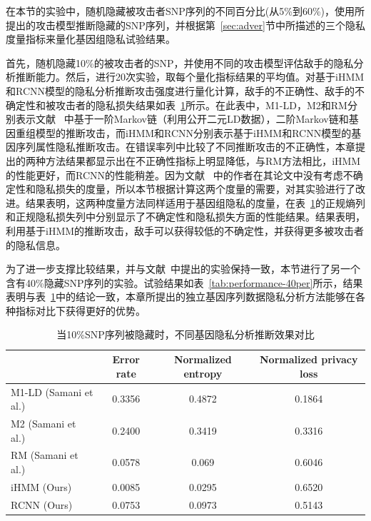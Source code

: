 在本节的实验中，随机隐藏被攻击者SNP序列的不同百分比(从5\%到60\%)，使用所提出的攻击模型推断隐藏的SNP序列，并根据第~\ref{sec:adver}节中所描述的三个隐私度量指标来量化基因组隐私试验结果。

首先，随机隐藏10\%的被攻击者的SNP，并使用不同的攻击模型评估敌手的隐私分析推断能力。然后，进行20次实验，取每个量化指标结果的平均值。对基于iHMM和RCNN模型的隐私分析推断攻击强度进行量化计算，敌手的不正确性、敌手的不确定性和被攻击者的隐私损失结果如表~\ref{tab:performance-10per}所示。在此表中，M1-LD，M2和RM分别表示文献~\cite{samani2015quantifying} 中基于一阶Markov链（利用公开二元LD数据），二阶Markov链和基因重组模型的推断攻击，而iHMM和RCNN分别表示基于iHMM和RCNN模型的基因序列属性隐私推断攻击。在错误率列中比较了不同推断攻击的不正确性，本章提出的两种方法结果都显示出在不正确性指标上明显降低，与RM方法相比，iHMM的性能更好，而RCNN的性能稍差。因为文献~\cite{samani2015quantifying} 中的作者在其论文中没有考虑不确定性和隐私损失的度量，所以本节根据计算这两个度量的需要，对其实验进行了改进。结果表明，这两种度量方法同样适用于基因组隐私的度量，在表~\ref{tab:performance-10per}的正规熵列和正规隐私损失列中分别显示了不确定性和隐私损失方面的性能结果。结果表明，利用基于iHMM的推断攻击，敌手可以获得较低的不确定性，并获得更多被攻击者的隐私信息。

为了进一步支撑比较结果，并与文献~\cite{samani2015quantifying}中提出的实验保持一致，本节进行了另一个含有40\%隐藏SNP序列的实验。试验结果如表~\ref{tab:performance-40per}所示，结果表明与表~\ref{tab:performance-10per}中的结论一致，本章所提出的独立基因序列数据隐私分析方法能够在各种指标对比下获得更好的优势。

\begin{table}[htbp]
	\caption{当10\%SNP序列被隐藏时，不同基因隐私分析推断效果对比}
	\label{tab:performance-10per}
	\begin{tabular}{lccc}
		\hline
		& Error rate & Normalized entropy & Normalized privacy loss\\
		\hline
		M1-LD (Samani et al.) & 0.3356  & 0.4872 & 0.1864 \\
		M2 (Samani et al.)    & 0.2400  & 0.3419 & 0.3316\\
		RM (Samani et al.)    &  0.0578 & 0.069 & 0.6046 \\
		iHMM (Ours)          & 0.0085  &0.0295 & 0.6520 \\
		RCNN (Ours)          & 0.0753  &0.0973 & 0.5143\\
		\hline
	\end{tabular}
\end{table}


